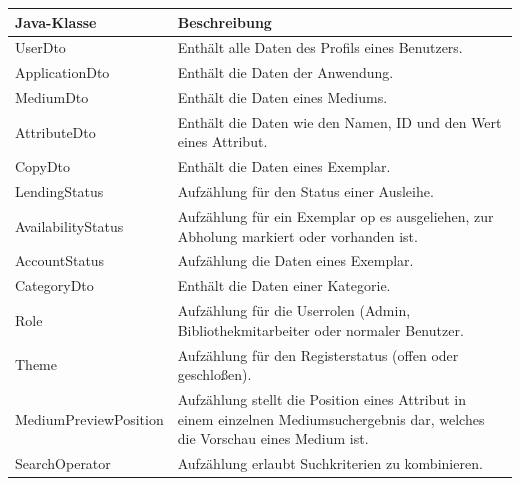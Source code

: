 \documentclass{article}
\begin{document}
\begin{center}
    \begin{table}
        \begin{tabular} { |p{}|p{}| }
            \hline
            Java-Klasse & Beschreibung  \\
             \hline\hline
            UserDto & Enthält alle Daten des Profils eines Benutzers. \\
            ApplicationDto & Enthält die Daten der Anwendung. \\
            \hline
            MediumDto & Enthält die Daten eines Mediums. \\
            \hline
            AttributeDto & Enthält die Daten wie den Namen, ID und den Wert eines Attribut.\\
            \hline
            CopyDto & Enthält die   Daten eines Exemplar. \\
            \hline
            LendingStatus & Aufzählung für den Status einer Ausleihe.\\
            \hline
            AvailabilityStatus & Aufzählung für ein Exemplar op es ausgeliehen, zur Abholung markiert oder vorhanden ist. \\
            \hline
            AccountStatus & Aufzählung die   Daten eines Exemplar. \\
            \hline
            CategoryDto & Enthält die Daten einer Kategorie. \\
            \hline
            Role & Aufzählung für die Userrolen  (Admin, Bibliothekmitarbeiter  oder normaler Benutzer. \\
            \hline
            Theme & Aufzählung für den Registerstatus (offen oder geschloßen). \\
            \hline
            MediumPreviewPosition & Aufzählung stellt die Position eines Attribut in einem einzelnen Mediumsuchergebnis dar, welches die Vorschau eines Medium ist. \\
            \hline
            SearchOperator & Aufzählung erlaubt Suchkriterien zu kombinieren. \\
            \hline

        \end{tabular}
        \end{table}
        \end{center}
\end{document}
